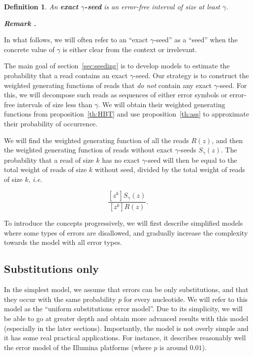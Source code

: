 \documentclass{article}
\newtheorem{definition}{Definition}
\newcounter{remarkcounter}
\newenvironment{remark}
{\small\it\vspace{0.5\baselineskip}
  \refstepcounter{remarkcounter}%
  \noindent\textbf{Remark \arabic{remarkcounter}.}%
}{\vspace{0.5\baselineskip}}
\begin{document}
\begin{definition}
\label{def:seed}
An \textbf{exact $\gamma$-seed} is an error-free interval of size at least
$\gamma$.
\end{definition}

\begin{remark}
In what follows, we will often refer to an ``exact $\gamma$-seed'' as a
``seed'' when the concrete value of $\gamma$ is either clear from the
context or irrelevant.
\end{remark}

The main goal of section~\ref{sec:seeding} is to develop models to
estimate the probability that a read contains an exact  $\gamma$-seed. Our
strategy is to construct the weighted generating functions of reads that
\emph{do not} contain any exact $\gamma$-seed. For this, we will decompose
such reads as sequences of either error symbols or error-free intervals
of size less than $\gamma$. We will obtain their weighted generating
functions from proposition~\ref{th:HBT} and use proposition~\ref{th:ass}
to approximate their probability of occurrence.

We will find the weighted generating function of all the reads $R(z)$, and
then the weighted generating function of reads without exact
$\gamma$-seeds $S_\gamma(z)$. The probability that a read of size $k$ has
no exact $\gamma$-seed will then be equal to the total weight of reads of
size $k$ without seed, divided by the total weight of reads of size $k$,
\textit{i.e.}

\begin{equation}
\label{eq:THEratio}
\frac{[z^k]S_\gamma(z)}{[z^k]R(z)}.
\end{equation}

To introduce the concepts progressively, we will first describe simplified
models where some types of errors are disallowed, and gradually
increase the complexity towards the model with all error types.






\subsection{Substitutions only}
\label{sec:substitutions}

In the simplest model, we assume that errors can be only substitutions,
and that they occur with the same probability $p$ for every nucleotide. We
will refer to this model as the ``uniform substitutions error model''. Due
to its simplicity, we will be able to go at greater depth and obtain more
advanced results with this model (especially in the later sections).
Importantly, the model is not overly simple and it has some real practical
applications. For instance, it describes reasonably well the error model
of the Illumina platforms (where $p$ is around $0.01$).
\end{document}
